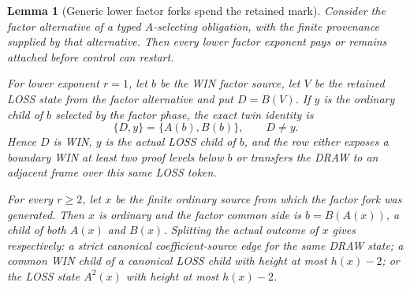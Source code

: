 \documentclass[11pt]{article}
\newtheorem{lemma}[theorem]{Lemma}
\begin{document}
\begin{lemma}[Generic lower factor forks spend the retained mark]
\label{lem:factor-fork-pay}
Consider the factor alternative of a typed $A$-selecting obligation, with the
finite provenance supplied by that alternative.  Then every lower factor
exponent pays or remains attached before control can restart.

For lower exponent $r=1$, let $b$ be the WIN factor source, let $V$ be the
retained LOSS state from the factor alternative and put $D=B(V)$.  If $y$ is
the ordinary child of $b$ selected by the factor phase, the exact twin identity
is
\[
 \{D,y\}=\{A(b),B(b)\},\qquad D\ne y.
\]
Hence $D$ is WIN, $y$ is the actual LOSS child of $b$, and the row either
exposes a boundary WIN at least two proof levels below $b$ or transfers the
DRAW to an adjacent frame over this same LOSS token.

For every $r\ge2$, let $x$ be the finite ordinary source from which the
factor fork was generated.  Then $x$ is ordinary and the factor common side is
$b=B(A(x))$, a child of both $A(x)$ and $B(x)$.  Splitting the actual outcome
of $x$ gives respectively: a strict canonical coefficient-source edge for the
same DRAW state; a common WIN child of a canonical LOSS child with height at
most $h(x)-2$; or the LOSS state $A^2(x)$ with height at most $h(x)-2$.
\end{lemma}
\end{document}
